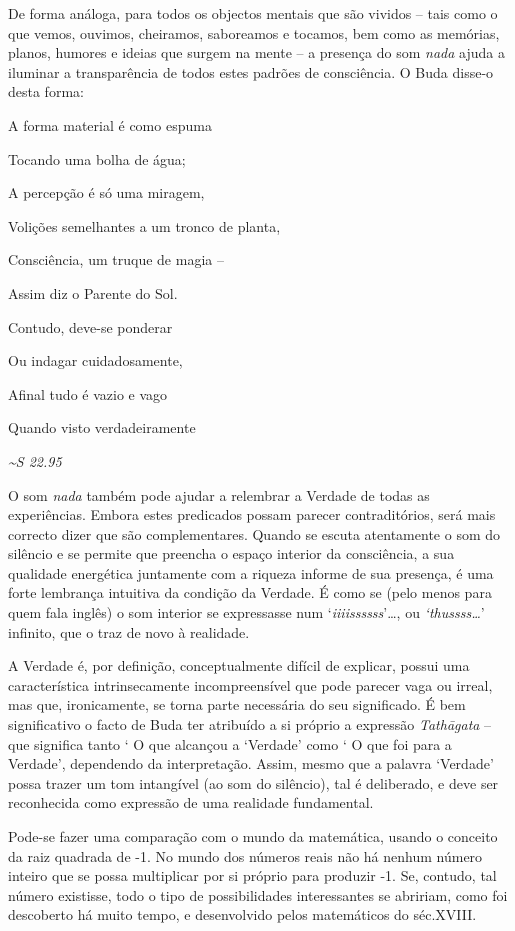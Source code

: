 De forma análoga, para todos os objectos mentais que são vividos -- tais
como o que vemos, ouvimos, cheiramos, saboreamos e tocamos, bem como as
memórias, planos, humores e ideias que surgem na mente -- a presença do
som \emph{nada} ajuda a iluminar a transparência de todos estes padrões
de consciência. O Buda disse-o desta forma:

A forma material é como espuma

Tocando uma bolha de água;

A percepção é só uma miragem,

Volições semelhantes a um tronco de planta,

Consciência, um truque de magia --

Assim diz o Parente do Sol.

Contudo, deve-se ponderar

Ou indagar cuidadosamente,

Afinal tudo é vazio e vago

Quando visto verdadeiramente

\emph{\textasciitilde{}S 22.95}

O som \emph{nada} também pode ajudar a relembrar a Verdade de todas as
experiências. Embora estes predicados possam parecer contraditórios,
será mais correcto dizer que são complementares. Quando se escuta
atentamente o som do silêncio e se permite que preencha o espaço
interior da consciência, a sua qualidade energética juntamente com a
riqueza informe de sua presença, é uma forte lembrança intuitiva da
condição da Verdade. É como se (pelo menos para quem fala inglês) o som
interior se expressasse num `\emph{iiiissssss}'\ldots{}, ou
\emph{`thussss\ldots{}}' infinito, que o traz de novo à realidade.

A Verdade é, por definição, conceptualmente difícil de explicar, possui
uma característica intrinsecamente incompreensível que pode parecer vaga
ou irreal, mas que, ironicamente, se torna parte necessária do seu
significado. É bem significativo o facto de Buda ter atribuído a si
próprio a expressão \emph{Tathāgata} -- que significa tanto ` O que
alcançou a `Verdade' como ` O que foi para a Verdade', dependendo da
interpretação. Assim, mesmo que a palavra `Verdade' possa trazer um tom
intangível (ao som do silêncio), tal é deliberado, e deve ser
reconhecida como expressão de uma realidade fundamental.

Pode-se fazer uma comparação com o mundo da matemática, usando o
conceito da raiz quadrada de -1. No mundo dos números reais não há
nenhum número inteiro que se possa multiplicar por si próprio para
produzir -1. Se, contudo, tal número existisse, todo o tipo de
possibilidades interessantes se abririam, como foi descoberto há muito
tempo, e desenvolvido pelos matemáticos do séc.XVIII.


